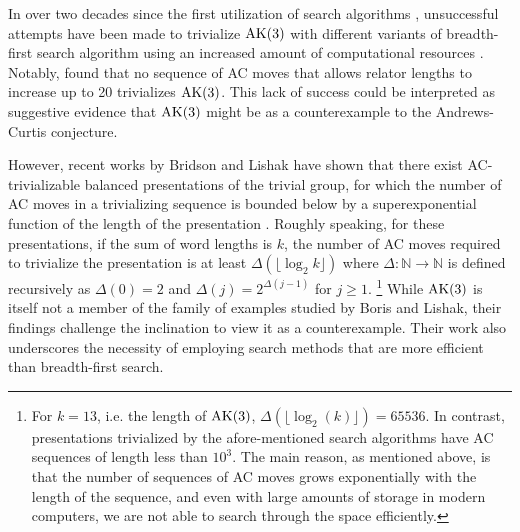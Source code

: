 In over two decades since the first utilization of search algorithms \cite{genetic, bfs-ac}, unsuccessful attempts have been made to trivialize $\text{AK}(3)$ with different variants of breadth-first search algorithm using an increased amount of computational resources \cite{Bowman-McCaul, krawiec2016distance, Panteleev-Ushakov}. Notably, \cite{Panteleev-Ushakov} found that no sequence of AC moves that allows relator lengths to increase up to 20 trivializes $\text{AK}(3)$. 
This lack of success could be interpreted as suggestive evidence that $\text{AK}(3)$ might be as a counterexample to the Andrews-Curtis conjecture.
\newline 

However, recent works by Bridson and Lishak have shown that there exist AC-trivializable balanced presentations of the trivial group, for which the number of AC moves in a trivializing sequence is bounded below by a superexponential function of the length of the presentation \cite{Bridson, Lishak}.
Roughly speaking, for these presentations, if the sum of word lengths is $k$, the number of AC moves required to trivialize the presentation is at least $\Delta (\lfloor \log_2 k \rfloor)$ where $\Delta \colon \mathbb{N} \to \mathbb{N}$ is defined recursively as $\Delta(0) = 2$ and $\Delta (j) = 2^{\Delta(j-1)}$ for $j \geq 1$. 
\footnote{For $k=13$, i.e. the length of $\text{AK}(3)$, $\Delta (\lfloor \log_2 (k) \rfloor) = 65536$. In contrast, presentations trivialized by the afore-mentioned search algorithms have AC sequences of length less than $10^3$. The main reason, as mentioned above, is that the number of sequences of AC moves grows exponentially with the length of the sequence, and even with large amounts of storage in modern computers, we are not able to search through the space efficiently.}
While $\text{AK}(3)$ is itself not a member of the family of examples studied by Boris and Lishak, their findings challenge the inclination to view it as a counterexample. Their work also underscores the necessity of employing search methods that are more efficient than breadth-first search.
\newline


